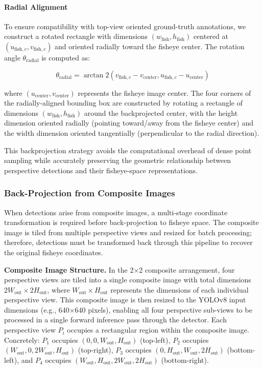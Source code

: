 \documentclass[twocolumn]{svjour3}          %
\begin{document}
\paragraph{Radial Alignment}

To ensure compatibility with top-view oriented ground-truth annotations, we construct a rotated rectangle with dimensions $(w_{\text{fish}}, h_{\text{fish}})$ centered at $(u_{\text{fish},c}, v_{\text{fish},c})$ and oriented radially toward the fisheye center. The rotation angle $\theta_{\text{radial}}$ is computed as:

\begin{equation}
    \theta_{\text{radial}} = \arctan2(v_{\text{fish},c} - v_{\text{center}}, u_{\text{fish},c} - u_{\text{center}})
    \label{eq:radial_angle}
\end{equation}

where $(u_{\text{center}}, v_{\text{center}})$ represents the fisheye image center. The four corners of the radially-aligned bounding box are constructed by rotating a rectangle of dimensions $(w_{\text{fish}}, h_{\text{fish}})$ around the backprojected center, with the height dimension oriented radially (pointing toward/away from the fisheye center) and the width dimension oriented tangentially (perpendicular to the radial direction).

This backprojection strategy avoids the computational overhead of dense point sampling while accurately preserving the geometric relationship between perspective detections and their fisheye-space representations.

\subsubsection{Back-Projection from Composite Images}
\label{sec:backproj_composite}

When detections arise from composite images, a multi-stage coordinate transformation is required before back-projection to fisheye space. The composite image is tiled from multiple perspective views and resized for batch processing; therefore, detections must be transformed back through this pipeline to recover the original fisheye coordinates.

\noindent
\textbf{Composite Image Structure.}
In the 2×2 composite arrangement, four perspective views are tiled into a single composite image with total dimensions $2W_{\text{out}} \times 2H_{\text{out}}$, where $W_{\text{out}} \times H_{\text{out}}$ represents the dimensions of each individual perspective view. This composite image is then resized to the YOLOv8 input dimensions (e.g., 640×640 pixels), enabling all four perspective sub-views to be processed in a single forward inference pass through the detector. Each perspective view $P_i$ occupies a rectangular region within the composite image. Concretely: $P_1$ occupies $(0, 0, W_{\text{out}}, H_{\text{out}})$ (top-left), $P_2$ occupies $(W_{\text{out}}, 0, 2W_{\text{out}}, H_{\text{out}})$ (top-right), $P_3$ occupies $(0, H_{\text{out}}, W_{\text{out}}, 2H_{\text{out}})$ (bottom-left), and $P_4$ occupies $(W_{\text{out}}, H_{\text{out}}, 2W_{\text{out}}, 2H_{\text{out}})$ (bottom-right).
\end{document}
